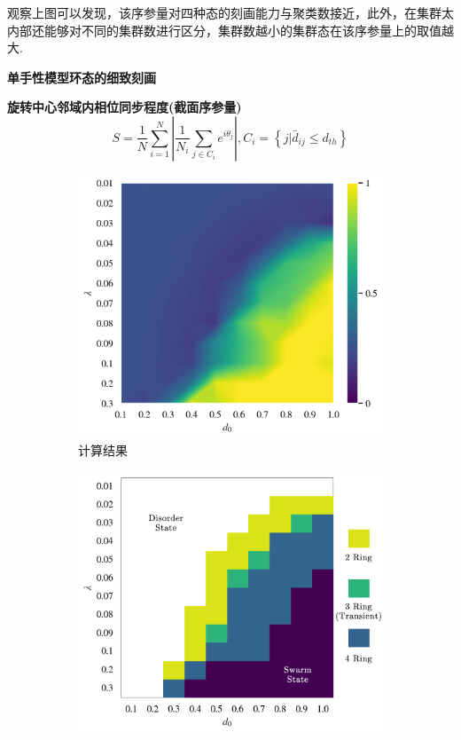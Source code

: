 \documentclass{article}
\begin{document}
观察上图可以发现，该序参量对四种态的刻画能力与聚类数接近，此外，在集群太内部还能够对不同的集群数进行区分，集群数越小的集群态在该序参量上的取值越大.

\newpage
\noindent\textbf{\large 单手性模型环态的细致刻画}

\noindent\textbf{旋转中心邻域内相位同步程度(截面序参量)}
$$
S=\frac{1}{N}\sum_{i=1}^N{\left| \frac{1}{N_i}\sum_{j\in C_i}{e^{i\theta _j}} \right|}, C_i=\left\{ j|\bar{d}_{ij}\le d_{th} \right\} 
$$
\vspace{-0.5cm}
\begin{figure}[H]
	\centering
	\begin{subfigure}[b]{0.49\textwidth}
		\includegraphics[width=\textwidth]{./figs/limitDisPhaseSyncRing.png}
		\vspace{-1cm}
		\caption{计算结果}
	\end{subfigure}
	\begin{subfigure}[b]{0.49\textwidth}
		\includegraphics[width=\textwidth]{./figs/subjectiveOpRing.png}

\end{subfigure}
\end{figure}
\end{document}
